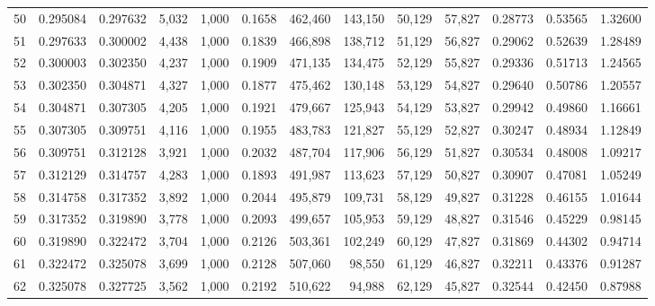 \begin{tabular}{rrrrrrrrrrrrr}
50  &  0.295084 &  0.297632 &   5,032 &  1,000 &                                     0.1658 &  462,460 &  143,150 &   50,129 &   57,827 &  0.28773 &  0.53565 &  1.32600 \\
51  &  0.297633 &  0.300002 &   4,438 &  1,000 &                                     0.1839 &  466,898 &  138,712 &   51,129 &   56,827 &  0.29062 &  0.52639 &  1.28489 \\
52  &  0.300003 &  0.302350 &   4,237 &  1,000 &                                     0.1909 &  471,135 &  134,475 &   52,129 &   55,827 &  0.29336 &  0.51713 &  1.24565 \\
53  &  0.302350 &  0.304871 &   4,327 &  1,000 &                                     0.1877 &  475,462 &  130,148 &   53,129 &   54,827 &  0.29640 &  0.50786 &  1.20557 \\
54  &  0.304871 &  0.307305 &   4,205 &  1,000 &                                     0.1921 &  479,667 &  125,943 &   54,129 &   53,827 &  0.29942 &  0.49860 &  1.16661 \\
55  &  0.307305 &  0.309751 &   4,116 &  1,000 &                                     0.1955 &  483,783 &  121,827 &   55,129 &   52,827 &  0.30247 &  0.48934 &  1.12849 \\
56  &  0.309751 &  0.312128 &   3,921 &  1,000 &                                     0.2032 &  487,704 &  117,906 &   56,129 &   51,827 &  0.30534 &  0.48008 &  1.09217 \\
57  &  0.312129 &  0.314757 &   4,283 &  1,000 &                                     0.1893 &  491,987 &  113,623 &   57,129 &   50,827 &  0.30907 &  0.47081 &  1.05249 \\
58  &  0.314758 &  0.317352 &   3,892 &  1,000 &                                     0.2044 &  495,879 &  109,731 &   58,129 &   49,827 &  0.31228 &  0.46155 &  1.01644 \\
59  &  0.317352 &  0.319890 &   3,778 &  1,000 &                                     0.2093 &  499,657 &  105,953 &   59,129 &   48,827 &  0.31546 &  0.45229 &  0.98145 \\
60  &  0.319890 &  0.322472 &   3,704 &  1,000 &                                     0.2126 &  503,361 &  102,249 &   60,129 &   47,827 &  0.31869 &  0.44302 &  0.94714 \\
61  &  0.322472 &  0.325078 &   3,699 &  1,000 &                                     0.2128 &  507,060 &   98,550 &   61,129 &   46,827 &  0.32211 &  0.43376 &  0.91287 \\
62  &  0.325078 &  0.327725 &   3,562 &  1,000 &                                     0.2192 &  510,622 &   94,988 &   62,129 &   45,827 &  0.32544 &  0.42450 &  0.87988 \\

\end{tabular}
